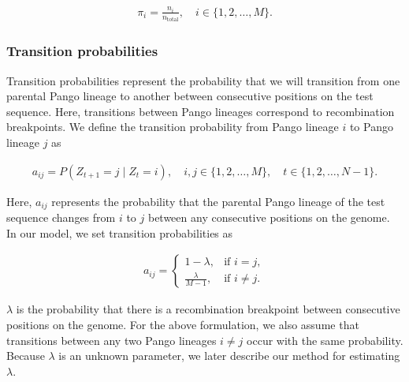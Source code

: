 \documentclass[11pt,oneside,letterpaper]{article}
\begin{document}
\begin{align*}
    \pi_i = \frac{n_i}{n_{\text{total}}}, \quad i \in \{1, 2, \dots, M\}.
\end{align*}

\subsubsection{Transition probabilities}

Transition probabilities represent the probability that we will transition from one parental Pango lineage to another between consecutive positions on the test sequence. Here, transitions between Pango lineages correspond to recombination breakpoints. We define the transition probability from Pango lineage $i$ to Pango lineage $j$ as

\begin{align*}
a_{ij} = P(Z_{t+1} = j \mid Z_t = i), \quad i,j \in \{1, 2, \dots, M\}, \quad t \in \{1, 2, \dots, N-1\}.
\end{align*}

Here, $a_{ij}$ represents the probability that the parental Pango lineage of the test sequence changes from $i$ to $j$ between any consecutive positions on the genome. In our model, we set transition probabilities as

\begin{align*}
a_{ij} =
\begin{cases}
1-\lambda, & \text{if } i = j, \\
\frac{\lambda}{M - 1}, & \text{if } i \neq j.
\end{cases}
\end{align*}

$\lambda$ is the probability that there is a recombination breakpoint between consecutive positions on the genome. For the above formulation, we also assume that transitions between any two Pango lineages $i \neq j$ occur with the same probability. Because $\lambda$ is an unknown parameter, we later describe our method for estimating $\lambda$. 


\end{document}
